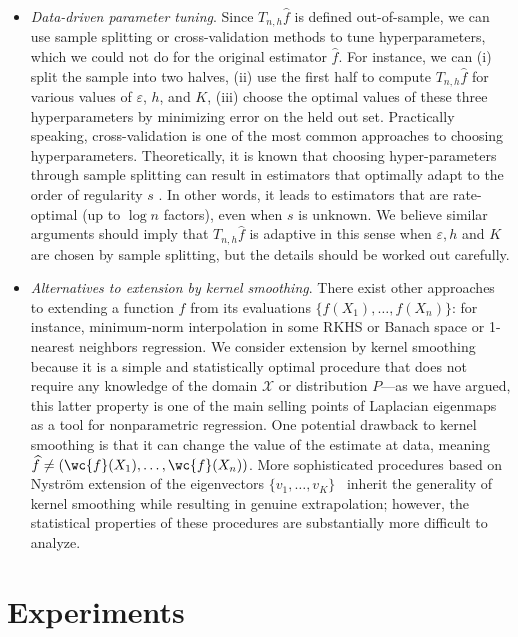 \documentclass[aos]{imsart}
\theoremstyle{plain}
\theoremstyle{definition}
\theoremstyle{remark}
\newcommand{\wh}[1]{\widehat{#1}}
\newcommand{\mc}[1]{\mathcal{#1}}
\newcommand{\1}{\mathbf{1}}
\begin{document}
\begin{itemize}
	\item \emph{Data-driven parameter tuning}. Since $T_{n,h}\wh{f}$ is defined out-of-sample, we can use sample splitting or cross-validation methods to tune hyperparameters, which we could not do for the original estimator $\wh{f}$. For instance, we can (i) split the sample into two halves, (ii) use the first half to compute $T_{n,h}\wh{f}$ for various values of $\varepsilon$, $h$, and $K$, (iii) choose the optimal values of these three hyperparameters by minimizing error on the held out set. Practically speaking, cross-validation is one of the most common approaches to choosing hyperparameters. Theoretically, it is known that choosing hyper-parameters through sample splitting can result in estimators that optimally adapt to the order of regularity $s$ \citep{gyorfi2006}. In other words, it leads to estimators that are rate-optimal (up to $\log n$ factors), even when $s$ is unknown. We believe similar arguments should imply that $T_{n,h}\wh{f}$ is adaptive in this sense when $\varepsilon,h$ and $K$ are chosen by sample splitting, but the details should be worked out carefully.
	
	\item \emph{Alternatives to extension by kernel smoothing}. There exist other approaches to extending a function $f$ from its evaluations $\{f(X_1),\ldots,f(X_n)\}$: for instance, minimum-norm interpolation in some RKHS or Banach space or 1-nearest neighbors regression.  We consider extension by kernel smoothing because it is a simple and statistically optimal procedure that does not require any knowledge of the domain $\mc{X}$ or distribution $P$---as we have argued, this latter property is one of the main selling points of Laplacian eigenmaps as a tool for nonparametric regression. One potential drawback to kernel smoothing is that it can change the value of the estimate at data, meaning $\wh{f} \neq (\wc{f}(X_1),\ldots, \wc{f}(X_n))$. More sophisticated procedures based on Nystr\"{o}m extension of the eigenvectors $\{v_1,\ldots,v_K\}$~\citep{fowlkes2004} inherit the generality of kernel smoothing while resulting in genuine extrapolation; however, the statistical properties of these procedures are substantially more difficult to analyze. 
\end{itemize}

\section{Experiments}
\label{sec:experiments}
\end{document}
